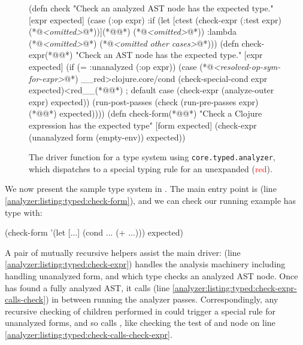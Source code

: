 \begin{figure}
  \lstset{numbers=left}
\begin{cljlisting}
(defn check
  "Check an analyzed AST node has the expected type."
  [expr expected]
  (case (:op expr)
    :if (let [ctest (check-expr (:test expr) (*@\emph{<omitted>}@*))](*@\label{analyzer:listing:typed:check-calls-check-expr}@*)
          (*@\emph{<omitted>}@*))
    :lambda (*@\emph{<omitted>}@*)
    (*@\emph{<omitted other cases>}@*)))
(defn check-expr(*@\label{analyzer:listing:typed:check-expr}@*)
  "Check an AST node has the expected type."
  [expr expected]
  (if (= :unanalyzed (:op expr))
    (case (*@\emph{<resolved-op-sym-for-expr>}@*)
      __red>clojure.core/cond (check-special-cond expr expected)<red__(*@\label{analyzer:listing:typed:check-expr:special-cond}@*)
      ; default case
      (check-expr (analyze-outer expr) expected))
    (run-post-passes
      (check (run-pre-passes expr)(*@\label{analyzer:listing:typed:check-expr-calls-check}@*)
             expected))))
(defn check-form(*@\label{analyzer:listing:typed:check-form}@*)
  "Check a Clojure expression has the expected type"
  [form expected]
  (check-expr (unanalyzed form (empty-env))
              expected))
\end{cljlisting}
  \caption{The driver function  for a type system using \texttt{core.typed.analyzer},
  which dispatches to a special typing rule for an unexpanded  (\textcolor{red}{red}).}
  \label{fig:analyzer:core.typed.analyzer-driver}
\end{figure}

We now present the sample type system in .
The main entry point is  (line \ref{analyzer:listing:typed:check-form}),
and we can check our running example has type 
with:
\begin{cljlisting}
(check-form '(let [...] (cond ... (+ ...)))
            expected)
\end{cljlisting}

A pair of mutually recursive helpers assist the main driver:  (line \ref{analyzer:listing:typed:check-expr})
handles the analysis machinery including handling unanalyzed form,
and 
which type checks an analyzed AST node.
Once  has found a fully analyzed AST, it calls
 (line \ref{analyzer:listing:typed:check-expr-calls-check})
in between running the analyzer passes.
Correspondingly, any recursive checking of children performed in 
could trigger a special rule for unanalyzed forms, and so
calls , like checking the test of and  node on
line \ref{analyzer:listing:typed:check-calls-check-expr}.

